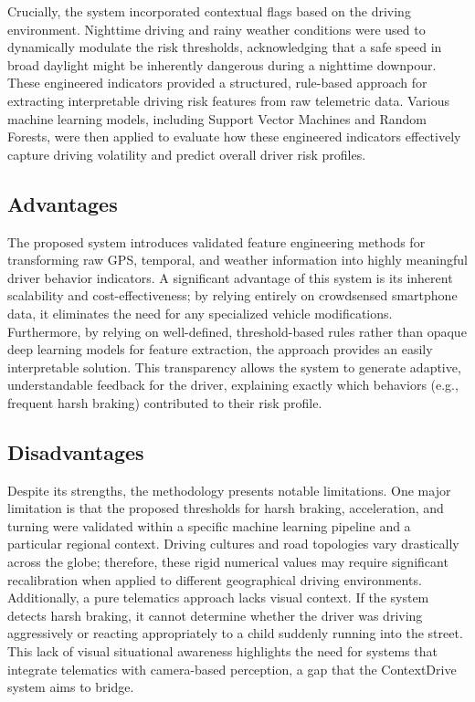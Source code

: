 Crucially, the system incorporated contextual flags based on the driving environment. Nighttime driving and rainy weather conditions were used to dynamically modulate the risk thresholds, acknowledging that a safe speed in broad daylight might be inherently dangerous during a nighttime downpour. These engineered indicators provided a structured, rule-based approach for extracting interpretable driving risk features from raw telemetric data. Various machine learning models, including Support Vector Machines and Random Forests, were then applied to evaluate how these engineered indicators effectively capture driving volatility and predict overall driver risk profiles.

\subsection{Advantages}
The proposed system introduces validated feature engineering methods for transforming raw GPS, temporal, and weather information into highly meaningful driver behavior indicators. A significant advantage of this system is its inherent scalability and cost-effectiveness; by relying entirely on crowdsensed smartphone data, it eliminates the need for any specialized vehicle modifications. Furthermore, by relying on well-defined, threshold-based rules rather than opaque deep learning models for feature extraction, the approach provides an easily interpretable solution. This transparency allows the system to generate adaptive, understandable feedback for the driver, explaining exactly which behaviors (e.g., frequent harsh braking) contributed to their risk profile.

\subsection{Disadvantages}
Despite its strengths, the methodology presents notable limitations. One major limitation is that the proposed thresholds for harsh braking, acceleration, and turning were validated within a specific machine learning pipeline and a particular regional context. Driving cultures and road topologies vary drastically across the globe; therefore, these rigid numerical values may require significant recalibration when applied to different geographical driving environments. Additionally, a pure telematics approach lacks visual context. If the system detects harsh braking, it cannot determine whether the driver was driving aggressively or reacting appropriately to a child suddenly running into the street. This lack of visual situational awareness highlights the need for systems that integrate telematics with camera-based perception, a gap that the ContextDrive system aims to bridge.

